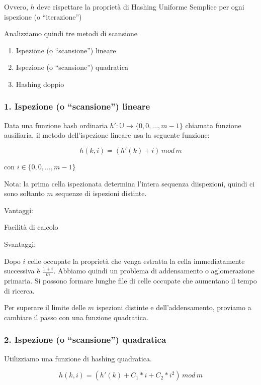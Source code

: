 \documentclass{article}
\providecommand{\tightlist}{%
  \setlength{\itemsep}{0pt}\setlength{\parskip}{0pt}}
\begin{document}
{Ovvero, $h$ deve rispettare la proprietà di Hashing Uniforme Semplice per ogni ispezione (o ``iterazione'') }

{Analizziamo quindi tre metodi di scansione}

\begin{enumerate}
\tightlist
\item
  {Ispezione (o ``scansione'') lineare}
\item
  {Ispezione (o ``scansione'') quadratica}
\item
  {Hashing doppio}
\end{enumerate}

\subsubsection{1. Ispezione (o ``scansione'') lineare}

{Data una funzione hash ordinaria $h':\mathbb{U} \rightarrow \{0,0,\ldots,m-1\}$ chiamata funzione ausiliaria, il metodo dell'ispezione lineare usa la seguente funzione:}

\begin{equation}
h(k,i) = (h'(k) + i)\,mod\,m
\end{equation}

{con $i \in \{0,0,\ldots,m-1\}$}

{Nota: la prima cella ispezionata determina l'intera sequenza diispezioni, quindi ci sono soltanto $m$ sequenze di ispezioni distinte.}

{Vantaggi: }

{Facilità di calcolo}

{Svantaggi}{: }

{Dopo $i$ celle occupate la proprietà che venga estratta la cella immediatamente successiva è $\frac{1+i}{m}$. Abbiamo quindi un problema di addensamento o aglomerazione primaria. Si possono formare lunghe file di celle occupate che aumentano il tempo di ricerca.}

{Per superare il limite delle $m$ ispezioni distinte e dell'addensamento, proviamo a cambiare il passo con una funzione quadratica.}

\subsubsection{2. Ispezione (o ``scansione'') quadratica}

{Utilizziamo una funzione di hashing quadratica.}

\begin{equation}
h(k,i) = (h'(k) + C_1*i + C_2 * i^2)\,mod\,m
\end{equation}
\end{document}
